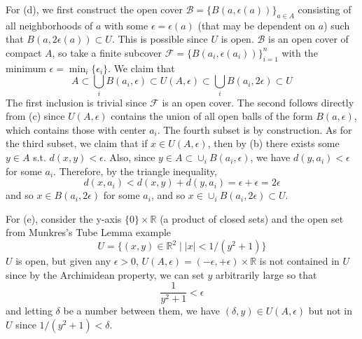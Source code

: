 \begin{solution}
    For (d), we first construct the open cover $\mathscr{B} = \{B(a, \epsilon(a))\}_{a \in A}$ consisting of all neighborhoods of $a$ with some $\epsilon = \epsilon(a)$ (that may be dependent on $a$) such that $B(a, 2\epsilon(a)) \subset U$. This is possible since $U$ is open. $\mathscr{B}$ is an open cover of compact $A$, so take a finite subcover $\mathscr{F} = \{B(a_i, \epsilon(a_i))\}_{i=1}^n$ with the minimum $\epsilon = \min_i \{\epsilon_i\}$. We claim that 
    \begin{equation}
      A \subset \bigcup_i B(a_i, \epsilon) \subset U(A, \epsilon) \subset \bigcup_i B(a_i, 2\epsilon) \subset U
    \end{equation} 
    The first inclusion is trivial since $\mathscr{F}$ is an open cover. The second follows directly from (c) since $U(A, \epsilon)$ contains the union of all open balls of the form $B(a, \epsilon)$, which contains those with center $a_i$. The fourth subset is by construction. As for the third subset, we claim that if $x \in U(A, \epsilon)$, then by (b) there exists some $y \in A$ s.t. $d(x, y) < \epsilon$. Also, since $y \in A \subset \cup_i B(a_i, \epsilon)$, we have $d(y, a_i) < \epsilon$ for some $a_i$. Therefore, by the triangle inequality, 
    \begin{equation}
      d(x, a_i) <  d(x, y) + d(y, a_i) = \epsilon + \epsilon = 2\epsilon  
    \end{equation}
    and so $x \in B(a_i, 2\epsilon)$ for some $a_i$, and so $x \in \cup_i B(a_i, 2\epsilon) \subset U$. 

    For (e), consider the y-axis $\{0\} \times \mathbb{R}$ (a product of closed sets) and the open set from Munkres's Tube Lemma example
    \begin{equation}
      U = \{(x, y) \in \mathbb{R}^2 \mid |x| < 1/(y^2 + 1)\}
    \end{equation}
    $U$ is open, but given any $\epsilon > 0$, $U(A, \epsilon) = (-\epsilon, +\epsilon) \times \mathbb{R}$ is not contained in $U$ since by the Archimidean property, we can set $y$ arbitrarily large so that 
    \begin{equation}
      \frac{1}{y^2 + 1} < \epsilon
    \end{equation} 
    and letting $\delta$ be a number between them, we have $(\delta, y) \in U(A, \epsilon)$ but not in $U$ since $1/(y^2 + 1) < \delta$. 
  \end{solution}

